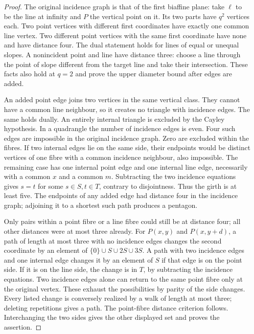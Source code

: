 \documentclass[11pt,a4paper]{article}
\begin{document}
\begin{proof}
The original incidence graph is that of the first biaffine plane:
take $\ell$ to be the line at infinity and $P$ the vertical point
on it. Its two parts have $q^2$ vertices each. Two point vertices
with different first coordinates have exactly one common line
vertex. Two different point vertices with the same first coordinate
have none and have distance four. The dual statement holds for lines
of equal or unequal slopes. A nonincident point and line have
distance three: choose a line through the point of slope different
from the target line and take their intersection. These facts also
hold at $q=2$ and prove the upper diameter bound after edges are added.

An added point edge joins two vertices in the same vertical class.
They cannot have a common line neighbour, so it creates no triangle
with incidence edges. The same holds dually. An entirely internal
triangle is excluded by the Cayley hypothesis.
In a quadrangle the number of incidence edges is even. Four such
edges are impossible in the original incidence graph. Zero are
excluded within the fibres. If two internal edges lie on the same
side, their endpoints would be distinct vertices of one fibre with
a common incidence neighbour, also impossible. The remaining case
has one internal point edge and one internal line edge, necessarily
with a common $x$ and a common $m$. Subtracting the two incidence
equations gives $s=t$ for some $s\in S,t\in T$, contrary to
disjointness. Thus the girth is at least five. The endpoints of any
added edge had distance four in the incidence graph; adjoining it
to a shortest such path produces a pentagon.

Only pairs within a point fibre or a line fibre could still be at
distance four; all other distances were at most three already.
For $P(x,y)$ and $P(x,y+d)$, a path of length at most three with
no incidence edges changes the second coordinate by an element of
$\{0\}\cup S\cup2S\cup3S$. A path with two incidence edges and
one internal edge changes it by an element of $S$ if that edge is
on the point side. If it is on the line side, the change is in $T$,
by subtracting the incidence equations. Two incidence edges alone
can return to the same point fibre only at the original vertex.
These exhaust the possibilities by parity of the side changes.
Every listed change is conversely realized by a walk of length
at most three; deleting repetitions gives a path. The point-fibre
distance criterion follows. Interchanging the two sides gives the
other displayed set and proves the assertion.
\end{proof}
\end{document}
